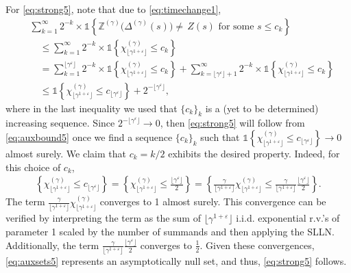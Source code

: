 \documentclass[11pt,leqno]{amsart}
\numberwithin{table}{section}
\numberwithin{figure}{section}
\numberwithin{equation}{section}
\newcommand{\1}{{\mathds{1}}}
\newcommand{\0}{\mat{0}}
\begin{document}
{For \eqref{eq:strong5}, note that due to \eqref{eq:timechange1},
\begin{align}
&\sum_{k=1}^{\infty}2^{-k}\times\mathds{1} \left\{\mathbb{Z}^{(\gamma)}\big(\Delta^{(\gamma)}(s)\big)\neq\, Z(s)\mbox{ for some }s\le c_k\right\}\nonumber\\
&\quad \le \sum_{k=1}^{\infty}2^{-k}\times\mathds{1} \left\{\chi^{(\gamma)}_{\lfloor \gamma^{1+\varepsilon}\rfloor}\le c_k\right\}\nonumber\\
&\quad = \sum_{k=1}^{\lfloor \gamma^{\varepsilon}\rfloor}2^{-k}\times\mathds{1} \left\{\chi^{(\gamma)}_{\lfloor \gamma^{1+\varepsilon}\rfloor}\le c_k\right\} + \sum_{k=\lfloor \gamma^{\varepsilon}\rfloor+1}^{\infty}2^{-k}\times\mathds{1} \left\{\chi^{(\gamma)}_{\lfloor \gamma^{1+\varepsilon}\rfloor}\le c_k\right\}\nonumber\\
& \quad\le \mathds{1} \left\{\chi^{(\gamma)}_{\lfloor \gamma^{1+\varepsilon}\rfloor} \le c_{\lfloor \gamma^{\varepsilon}\rfloor}\right\} + 2^{-\lfloor \gamma^{\varepsilon}\rfloor},\label{eq:auxbound5}
\end{align}
where in the last inequality we used that $\{c_k\}_k$ is a (yet to be determined) increasing sequence. Since $2^{-\lfloor \gamma^{\varepsilon}\rfloor}\rightarrow 0$, then \eqref{eq:strong5} will follow from \eqref{eq:auxbound5} once we find a sequence $\{c_k\}_k$ such that $\mathds{1} \left\{\chi^{(\gamma)}_{\lfloor \gamma^{1+\varepsilon}\rfloor} \le c_{\lfloor \gamma^{\varepsilon}\rfloor}\right\}\rightarrow 0$ almost surely. We claim that $c_k=k/2$ exhibits the desired property. Indeed, for this choice of $c_k$,
\begin{align}
\left\{\chi^{(\gamma)}_{\lfloor \gamma^{1+\varepsilon}\rfloor} \le c_{\lfloor \gamma^{\varepsilon}\rfloor}\right\} = \left\{\chi^{(\gamma)}_{\lfloor \gamma^{1+\varepsilon}\rfloor} \le \frac{\lfloor \gamma^{\varepsilon}\rfloor}{2}\right\} = \left\{\frac{\gamma}{\lfloor \gamma^{1+\varepsilon}\rfloor}\chi^{(\gamma)}_{\lfloor \gamma^{1+\varepsilon}\rfloor} \le \frac{\gamma}{\lfloor \gamma^{1+\varepsilon}\rfloor}\frac{\lfloor \gamma^{\varepsilon}\rfloor}{2}\right\}.\label{eq:auxsets5}
\end{align}
The term $\frac{\gamma}{\lfloor \gamma^{1+\varepsilon}\rfloor}\chi^{(\gamma)}_{\lfloor \gamma^{1+\varepsilon}\rfloor}$ converges to 1 almost surely. This convergence can be verified by interpreting the term as the sum of $\lfloor \gamma^{1+\varepsilon}\rfloor$ i.i.d. exponential r.v.'s of parameter 1 scaled by the number of summands and then applying the SLLN. Additionally, the term $\frac{\gamma}{\lfloor \gamma^{1+\varepsilon}\rfloor}\frac{\lfloor \gamma^{\varepsilon}\rfloor}{2}$ converges to $\frac{1}{2}$. Given these convergences, \eqref{eq:auxsets5} represents an asymptotically null set, and thus, \eqref{eq:strong5} follows.

}
\end{document}
